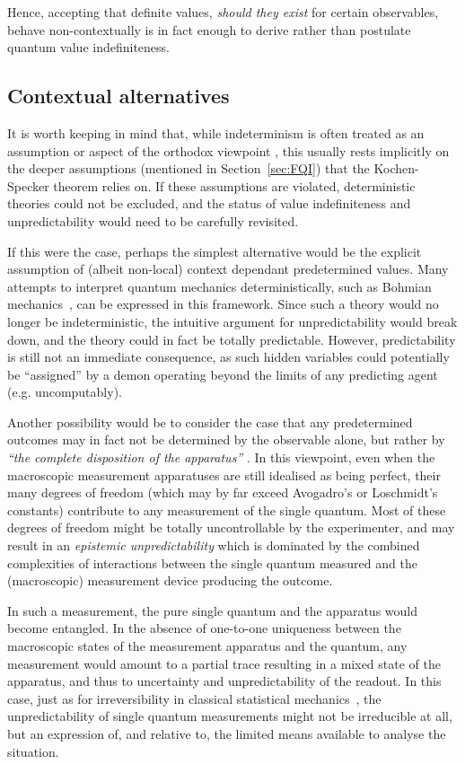 \documentclass[%
 superscriptaddress,
 preprint,
 showpacs,
 showkeys,
 preprintnumbers,
  amsmath,amssymb,
  aps,
 pra,
  longbibliography,
  floatfix,
 ]{revtex4-1}
\theoremstyle{definition}
\begin{document}
Hence,  accepting that definite values, \emph{should they exist} for certain observables, behave non-contextually is in fact enough to derive rather than postulate quantum value indefiniteness.


\subsection{Contextual alternatives}
\label{sec:ac}

It is worth keeping in mind that, while indeterminism is often treated as an assumption or aspect of the orthodox viewpoint \cite{born-26-1,zeil-05_nature_ofQuantum}, this usually rests implicitly on the deeper assumptions (mentioned in
Section~\ref{sec:FQI})  that the Kochen-Specker theorem relies on.
If these assumptions are violated, deterministic theories could not be excluded, and the status of value indefiniteness and unpredictability would need to be carefully revisited.

If this were the case, perhaps the simplest alternative would be the explicit assumption of (albeit non-local) context dependant predetermined values.
Many attempts to interpret quantum mechanics deterministically, such as Bohmian mechanics~\cite{Bohm52}, can be expressed in this framework.
Since such a theory would no longer be indeterministic, the intuitive argument for unpredictability would break down, and the theory could in fact be totally predictable.
However, predictability is still not an immediate consequence, as such hidden variables could potentially be ``assigned'' by a demon operating beyond the limits of any predicting agent (e.g. uncomputably).

Another possibility would be to consider the case that any predetermined outcomes may in fact not be determined by the observable alone, but rather by {\em ``the complete disposition  of the apparatus''} \cite[Sec.~5]{bell-66}.
In this viewpoint, even when the macroscopic measurement apparatuses are still idealised as being perfect, their many degrees of freedom (which may by far exceed Avogadro's  or Loschmidt's constants) contribute to any measurement of the single quantum.
Most of these degrees of freedom might be totally uncontrollable by the experimenter, and may result in an {\em epistemic unpredictability} which is dominated by the combined complexities of interactions between the single quantum measured and the (macroscopic) measurement device producing the outcome.

In such a measurement, the pure single quantum and the apparatus would become entangled.
In the absence of one-to-one uniqueness between the macroscopic states of the measurement apparatus and the quantum, any measurement would amount to a partial trace resulting in a mixed state of the apparatus, and thus to uncertainty and unpredictability of the readout.
In this case, just as for irreversibility in classical statistical mechanics~\cite{Myrvold2011237}, the unpredictability of single quantum measurements might not be irreducible at all, but  an expression of, and relative to, the limited means available to analyse the situation.
\end{document}
